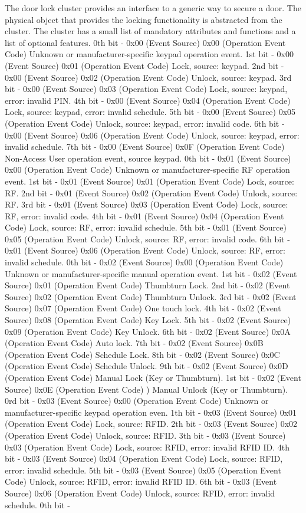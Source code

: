 The door lock cluster provides an interface to a generic way to secure a door. The physical object that provides the locking functionality is abstracted from the cluster. The cluster has a small list of mandatory attributes and functions and a list of optional features. 0th bit - 0x00 (Event Source) 0x00 (Operation Event Code) Unknown or manufacturer-specific keypad operation event. 1st bit - 0x00 (Event Source) 0x01 (Operation Event Code) Lock, source: keypad. 2nd bit - 0x00 (Event Source) 0x02 (Operation Event Code) Unlock, source: keypad. 3rd bit - 0x00 (Event Source) 0x03 (Operation Event Code) Lock, source: keypad, error: invalid PIN. 4th bit - 0x00 (Event Source) 0x04 (Operation Event Code) Lock, source: keypad, error: invalid schedule. 5th bit - 0x00 (Event Source) 0x05 (Operation Event Code) Unlock, source: keypad, error: invalid code. 6th bit - 0x00 (Event Source) 0x06 (Operation Event Code) Unlock, source: keypad, error: invalid schedule. 7th bit - 0x00 (Event Source) 0x0F (Operation Event Code) Non-Access User operation event, source keypad. 0th bit - 0x01 (Event Source) 0x00 (Operation Event Code)  Unknown or manufacturer-specific RF operation event. 1st bit - 0x01 (Event Source) 0x01 (Operation Event Code)  Lock, source: RF. 2nd bit - 0x01 (Event Source) 0x02 (Operation Event Code)  Unlock, source: RF. 3rd bit - 0x01 (Event Source) 0x03 (Operation Event Code)  Lock, source: RF, error: invalid code. 4th bit - 0x01 (Event Source) 0x04 (Operation Event Code)  Lock, source: RF, error: invalid schedule. 5th bit - 0x01 (Event Source) 0x05 (Operation Event Code)  Unlock, source: RF, error: invalid code. 6th bit - 0x01 (Event Source) 0x06 (Operation Event Code)  Unlock, source: RF, error: invalid schedule. 0th bit - 0x02 (Event Source) 0x00 (Operation Event Code)  Unknown or manufacturer-specific manual operation event. 1st bit - 0x02 (Event Source) 0x01 (Operation Event Code)  Thumbturn Lock. 2nd bit - 0x02 (Event Source) 0x02 (Operation Event Code)  Thumbturn Unlock. 3rd bit - 0x02 (Event Source) 0x07 (Operation Event Code)  One touch lock. 4th bit - 0x02 (Event Source) 0x08 (Operation Event Code)  Key Lock. 5th bit - 0x02 (Event Source) 0x09 (Operation Event Code)  Key Unlock. 6th bit - 0x02 (Event Source) 0x0A (Operation Event Code)  Auto lock. 7th bit - 0x02 (Event Source) 0x0B (Operation Event Code)  Schedule Lock. 8th bit - 0x02 (Event Source) 0x0C (Operation Event Code)  Schedule Unlock. 9th bit - 0x02 (Event Source) 0x0D (Operation Event Code)  Manual Lock (Key or Thumbturn). 1st bit - 0x02 (Event Source) 0x0E (Operation Event Code) ) Manual Unlock (Key or Thumbturn). 0rd bit - 0x03 (Event Source) 0x00 (Operation Event Code)  Unknown or manufacturer-specific keypad operation even. 1th bit - 0x03 (Event Source) 0x01 (Operation Event Code)  Lock, source: RFID. 2th bit - 0x03 (Event Source) 0x02 (Operation Event Code)  Unlock, source: RFID. 3th bit - 0x03 (Event Source) 0x03 (Operation Event Code)  Lock, source: RFID, error: invalid RFID ID. 4th bit - 0x03 (Event Source) 0x04 (Operation Event Code)  Lock, source: RFID, error: invalid schedule. 5th bit - 0x03 (Event Source) 0x05 (Operation Event Code)  Unlock, source: RFID, error: invalid RFID ID. 6th bit - 0x03 (Event Source) 0x06 (Operation Event Code)  Unlock, source: RFID, error: invalid schedule. 0th bit - 